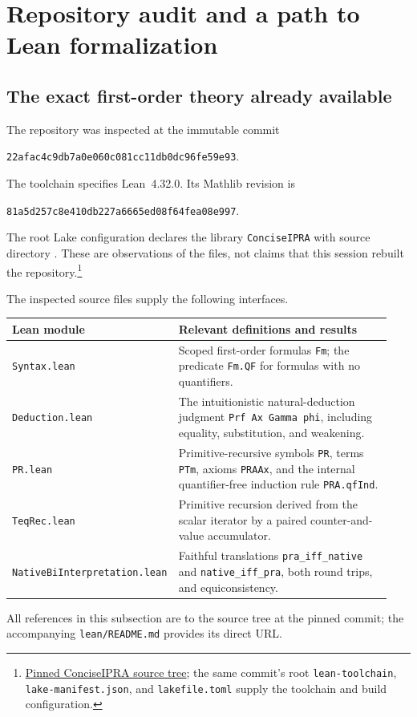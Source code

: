 \section{Repository audit and a path to Lean formalization}
\label{sec:repository-audit}

\subsection{The exact first-order theory already available}

The repository was inspected at the immutable commit
\begin{center}
\texttt{22afac4c9db7a0e060c081cc11db0dc96fe59e93}.
\end{center}
The toolchain specifies Lean~4.32.0. Its Mathlib revision is
\begin{center}
\texttt{81a5d257c8e410db227a6665ed08f64fea08e997}.
\end{center}
The root Lake configuration declares the library \texttt{ConciseIPRA}
with source directory
.
These are observations of the files, not claims that this session rebuilt
the repository.\footnote{\href{https://github.com/VladimirReshetnikov/ProveIt/tree/22afac4c9db7a0e060c081cc11db0dc96fe59e93/Logic/PrimitiveRecursiveArithmetic/ConciseIPRA}{Pinned ConciseIPRA source tree}; the same commit's root
\texttt{lean-toolchain}, \texttt{lake-manifest.json}, and
\texttt{lakefile.toml} supply the toolchain and build configuration.}

The inspected source files supply the following interfaces.
\begin{center}
\small
\begin{tabular}{@{}>{\raggedright\arraybackslash}p{0.38\linewidth}>{\raggedright\arraybackslash}p{0.56\linewidth}@{}}
\hline
Lean module & Relevant definitions and results\\
\hline
\texttt{Syntax.lean} & Scoped first-order formulas \texttt{Fm}; the predicate
\texttt{Fm.QF} for formulas with no quantifiers.\\
\texttt{Deduction.lean} & The intuitionistic natural-deduction judgment
\texttt{Prf Ax Gamma phi}, including equality, substitution, and weakening.\\
\texttt{PR.lean} & Primitive-recursive symbols \texttt{PR}, terms
\texttt{PTm}, axioms \texttt{PRAAx}, and the internal quantifier-free
induction rule \texttt{PRA.qfInd}.\\
\texttt{TeqRec.lean} & Primitive recursion derived from the scalar
iterator by a paired counter-and-value accumulator.\\
\texttt{NativeBiInterpretation.lean} & Faithful translations
\texttt{pra\_iff\_native} and \texttt{native\_iff\_pra}, both round trips,
and equiconsistency.\\
\hline
\end{tabular}
\end{center}
All references in this subsection are to the source tree at the pinned
commit; the accompanying \texttt{lean/README.md} provides its direct URL.

